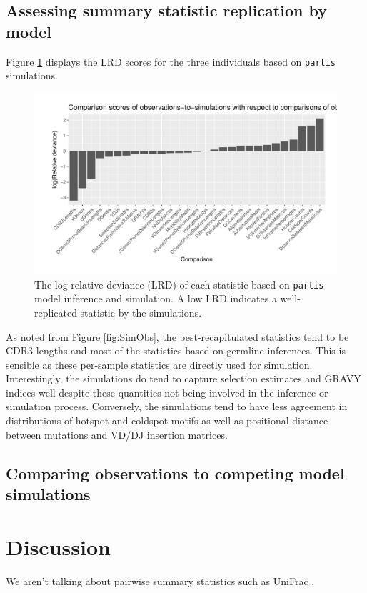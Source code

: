 \documentclass{article}
\begin{document}
\subsection*{Assessing summary statistic replication by model}
Figure \ref{Scores} displays the LRD scores for the three individuals based on \texttt{partis} simulations.
\begin{figure}
    \includegraphics[width=\linewidth]{Figures/score_plot.pdf}
    \caption{The log relative deviance (LRD) of each statistic based on \texttt{partis} model inference and simulation.
        A low LRD indicates a well-replicated statistic by the simulations.
    }
    \label{Scores}
\end{figure}
As noted from Figure \ref{fig:SimObs}, the best-recapitulated statistics tend to be CDR3 lengths and most of the statistics based on germline inferences.
This is sensible as these per-sample statistics are directly used for simulation.
Interestingly, the simulations do tend to capture selection estimates and GRAVY indices well despite these quantities not being involved in the inference or simulation process.
Conversely, the simulations tend to have less agreement in distributions of hotspot and coldspot motifs as well as positional distance between mutations and VD/DJ insertion matrices.

\subsection*{Comparing observations to competing model simulations}

\section*{Discussion}
We aren't talking about pairwise summary statistics such as UniFrac \cite{De_Bourcy2017-pu}.
\end{document}
